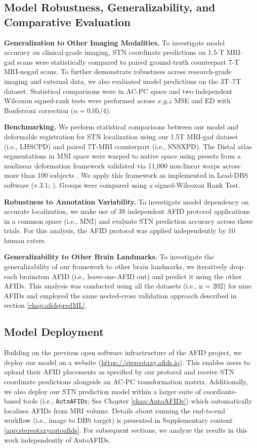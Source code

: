 \subsection{Model Robustness, Generalizability, and Comparative Evaluation}

\textbf{Generalization to Other Imaging Modalities.} To investigate model accuracy on clinical-grade imaging, STN coordinate predictions on 1.5-T MRI-gad scans were statistically compared to paired ground-truth counterpart 7-T MRI-nogad scans. To further demonstrate robustness across research-grade imaging and external data, we also evaluated model predictions on the 3T–7T dataset. Statistical comparisons were in AC-PC space and two independent Wilcoxon signed-rank tests were performed across $x$,$y$,$z$ MSE and ED with Bonferroni correction ($\alpha = 0.05 / 4$).

\textbf{Benchmarking.} We perform statistical comparisons between our model and deformable registration for STN localization using our 1.5T MRI-gad dataset (i.e., LHSCPD) and paired 7T-MRI counterpart (i.e., SNSXPD). The Distal atlas segmentations in MNI space \cite{Chakravarty2006-ln, Ewert2018-bn} were warped to native space using presets from a nonlinear deformation framework validated via 11,000 non-linear warps across more than 100 subjects \cite{Ewert2019-cc}. We apply this framework as implemented in Lead-DBS software (v.3.1; \cite{Neudorfer2023-wd}). Groups were compared using a signed-Wilcoxon Rank Test.

\textbf{Robustness to Annotation Variability.} To investigate model dependency on accurate localization, we make use of 38 independent AFID protocol applications in a common space (i.e., MNI) and evaluate STN prediction accuracy across these trials. For this analysis, the AFID protocol was applied independently by 10 human raters. 

\textbf{Generalizability to Other Brain Landmarks.} To investigate the generalizability of our framework to other brain landmarks, we iteratively drop each brainstem AFID (i.e., leave-one-AFID out) and predict it using the other AFIDs. This analysis was conducted using all the datasets (i.e., n = 202) for nine AFIDs and employed the same nested-cross validation approach described in section \ref{chap:afidspredML}.

\subsection{Model Deployment}
Building on the previous open software infrastructure of the AFID project, we deploy our model on a website (\url{https://stereotaxy.afids.io}). This enables users to upload their AFID placements as specified by our protocol and receive STN coordinate predictions alongside an AC-PC transformation matrix. Additionally, we also deploy our STN prediction model within a larger suite of coordiante-based tools (i.e., \texttt{AutoAFIDs}; See Chapter \ref{chap:AutoAFIDs}) which automatically localizes AFIDs from MRI volume. Details about running the end-to-end workflow (i.e., image to DBS target) is presented in Supplementary content \ref{app:stereotaxyautoafids}. For subsequent sections, we analyze the results in this work independently of AutoAFIDs. 

